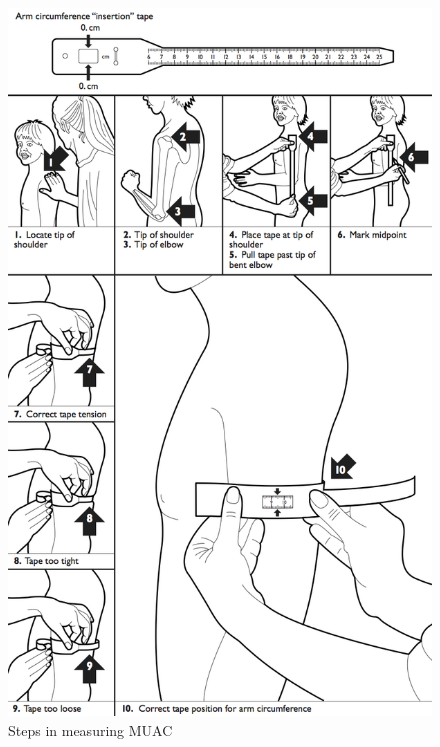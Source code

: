 \documentclass[
  12pt,
]{book}
\begin{document}
\begin{figure}

{\centering \includegraphics[width=10.96in]{images/muac02} 

}

\caption{Steps in measuring MUAC}\label{fig:muac2}
\end{figure}
\end{document}
